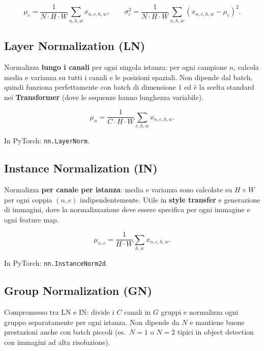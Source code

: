 \begin{equation}
  \mu_c = \frac{1}{N \cdot H \cdot W} \sum_{n,h,w} x_{n,c,h,w}, \qquad
  \sigma_c^2 = \frac{1}{N \cdot H \cdot W}
               \sum_{n,h,w} (x_{n,c,h,w} - \mu_c)^2.
\end{equation}

\subsection{Layer Normalization (LN)}
\label{subsec:layer-norm}

Normalizza \textbf{lungo i canali} per ogni singola istanza: per ogni
campione $n$, calcola media e varianza su tutti i canali e le posizioni
spaziali. Non dipende dal batch, quindi funziona perfettamente con batch di
dimensione $1$ ed è la scelta standard nei \textbf{Transformer} (dove le
sequenze hanno lunghezza variabile).

\begin{equation}
  \mu_n = \frac{1}{C \cdot H \cdot W} \sum_{c,h,w} x_{n,c,h,w}.
\end{equation}

In PyTorch: \texttt{nn.LayerNorm}.

\subsection{Instance Normalization (IN)}
\label{subsec:instance-norm}

Normalizza \textbf{per canale per istanza}: media e varianza sono calcolate
su $H \times W$ per ogni coppia $(n, c)$ indipendentemente. Utile in
\textbf{style transfer} e generazione di immagini, dove la normalizzazione
deve essere specifica per ogni immagine e ogni feature map.

\begin{equation}
  \mu_{n,c} = \frac{1}{H \cdot W} \sum_{h,w} x_{n,c,h,w}.
\end{equation}

In PyTorch: \texttt{nn.InstanceNorm2d}.

\subsection{Group Normalization (GN)}
\label{subsec:group-norm}

Compromesso tra LN e IN: divide i $C$ canali in $G$ gruppi e normalizza
ogni gruppo separatamente per ogni istanza. Non dipende da $N$ e mantiene
buone prestazioni anche con batch piccoli (es.\ $N=1$ o $N=2$ tipici in
object detection con immagini ad alta risoluzione).

